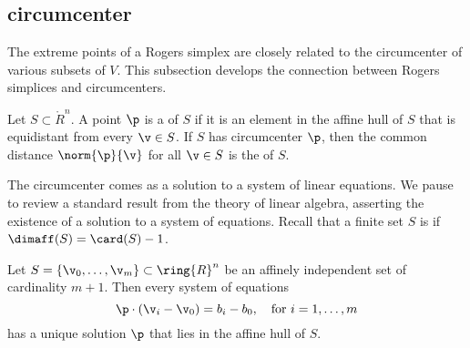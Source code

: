 \subsection{circumcenter}

The extreme points of a Rogers simplex are closely related to the
circumcenter of various subsets of $V$.  This subsection develops the
connection between Rogers simplices and circumcenters.

\begin{definition} 
  Let $S\subset\ring{R}^n$.  A point $\p$ is a 
  of $S$ if it is an element in the affine hull of $S$ that is
  equidistant from every $\v\in S$.  If $S$ has circumcenter $\p$,
  then the common distance $\norm{\p}{\v}$ for all $\v\in S$ is the
   of $S$.
\end{definition}
%

The circumcenter comes as a solution to a system of linear equations.
We pause to review a standard result from the theory of linear
algebra, asserting the existence of a solution to a system of
equations.  Recall that a finite set $S$ is 
if $\dimaff(S) = \card(S) -1$.  
%
%

\begin{lemma}\label{lemma:affine-system} 
  Let $S=\{\v_0,\ldots,\v_m\}\subset \ring{R}^n$ be an affinely
  independent set of cardinality $m+1$.  Then every system of
  equations
\[  
\p \cdot (\v_i - \v_0) = b_i-b_0,\quad \text{for } i=1,\ldots,m
\] 
has a unique solution  $\p$ that lies in the affine hull of $S$.
\end{lemma}

